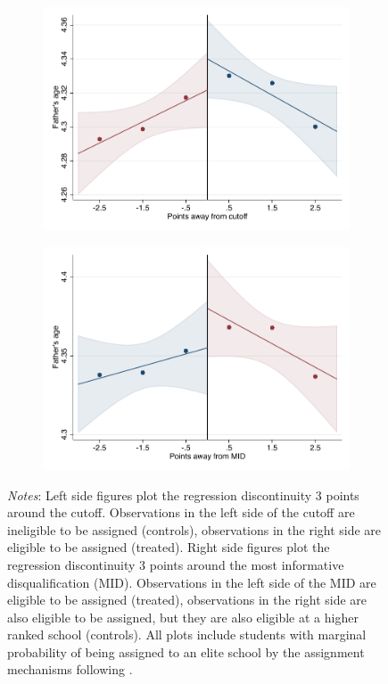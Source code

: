 \documentclass[oneside,11pt]{article}
\begin{document}
\begin{figure}[H]
\begin{center}
    \begin{subfigure}{0.475\textwidth}
        \centering
        \includegraphics[width=\textwidth]{04_Figures/rd_plot_tau_edad_pad_UNAM3.pdf}
    \end{subfigure}
    \begin{subfigure}{0.475\textwidth}
        \centering
        \includegraphics[width=\textwidth]{04_Figures/rd_plot_mid_edad_pad_UNAM3.pdf}
    \end{subfigure}
    \end{center}
    
\footnotesize
\textit{Notes}: Left side figures plot the regression discontinuity 3 points around the cutoff. Observations in the left side of the cutoff are ineligible to be assigned (controls), observations in the right side are eligible to be assigned (treated). Right side figures plot the regression discontinuity 3 points around the most informative disqualification (MID). Observations in the left side of the MID are eligible to be assigned (treated), observations in the right side are also eligible to be assigned, but they are also eligible at a higher ranked school (controls). All plots include students with marginal probability of being assigned to an elite school by the assignment mechanisms following \citet{abdulkadirouglu2022breaking}. 
\end{figure}
\end{document}
